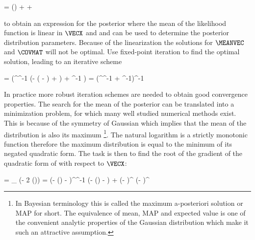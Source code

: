         \startformula
            \VECB = \FWD() + 
             + \MEANVECERR
        \stopformula

        to obtain an expression for the posterior where the mean of the
        likelihood function is linear in $\VECX$ and  and
         can be used to determine the posterior
        distribution parameters. Because of the linearization the solutions for
        $\MEANVEC$ and $\COVMAT$ will not be optimal. Use fixed-point iteration
        to find the optimal solution, leading to an iterative scheme

        \startsubformulas[eq:gausspostiter]
        \placesubformula
        \startformula
        \startalign[n=3,align={right,left,right}]
            \NC {} = \NC
                 (^\top \COVMATERR^{-1}
                (\VECY - \FWD( - \MEANVECERR)
                +  ) + \COVMATA^{-1} \MEANVECA)
                \EQCOMMA \NC \NR[eq:gausspostmeaniter][a]
            \NC {} = \NC
                (^\top \COVMATERR^{-1} 
                + \COVMATA^{-1})^{-1}
                \EQSTOP \NC \NR[eq:gausspostcoviter][b]
        \stopalign
        \stopformula
        \stopsubformulas

        In practice more robust iteration schemes are needed to obtain good
        convergence properties. The search for the mean of the posterior can be
        translated into a minimization problem, for which many well studied
        numerical methods exist. This is because of the symmetry of Gaussian
        which implies that the mean of the distribution is also its maximum
        \footnote{In Bayesian terminology this is called the maximum
        a-posteriori solution or MAP for short. The equivalence of mean, MAP
        and expected value is one of the convenient analytic properties of
        the Gaussian distribution which make it such an attractive
        assumption.}. The natural logarithm is a strictly monotonic function
        therefore the maximum distribution is equal to the minimum of its
        negated quadratic form. The task is then to find the root of the
        gradient of the quadratic form of  with
        respect to $\VECX$:

        \placeformula
        \startformula
        \startalign[n=2,align={right,left}]
             = \NC \nabla_{\VECX} (- 2 \ln(\POSTERIOR)) \NR
            \NC = \NC (\VECY - \FWD(\VECX) - \MEANVECERR)^\top \COVMAT^{-1}
                (\VECY - \FWD(\VECX) - \MEANVECERR) + (\VECX - \MEANVECA)^\top
                \COVMATA (\VECX - \MEANVECX)^\top \EQSTOP \NR[eq:gaussminimization]
        \stopalign
        \stopformula
        
